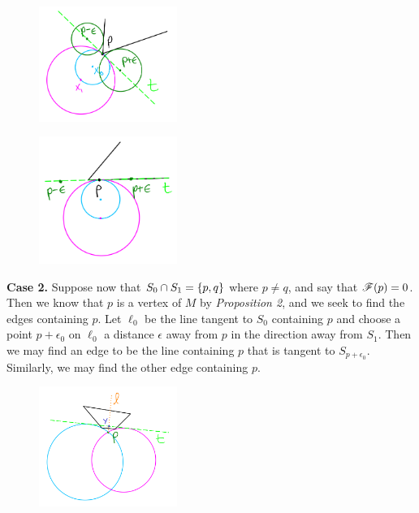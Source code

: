 \documentclass[12pt]{article}
\begin{document}
\begin{flushleft}
\begin{figure}[H]
	\centering
	\includegraphics[width=0.4\textwidth]{5.png}
\end{figure}
\begin{figure}[H]
	\centering
	\includegraphics[width=0.4\textwidth]{6.png}
\end{figure}

\textbf{Case 2.}
Suppose now that $S_0\cap S_1=\{p,q\}$ where $p\neq q$, and say that $\mathscr{F}(p)=0$.
Then we know that $p$ is a vertex of $M$ by \textit{Proposition 2}, and we seek to find the edges containing $p$.
Let $\ell_0$ be the line tangent to $S_0$ containing $p$ and choose a point $p+\epsilon_0$ on $\ell_0$ a distance $\epsilon$ away from $p$ in the direction away from $S_1$.
Then we may find an edge to be the line containing $p$ that is tangent to $S_{p+\epsilon_0}$.
Similarly, we may find the other edge containing $p$.

\begin{figure}[H]
	\centering
	\includegraphics[width=0.4\textwidth]{7.png}
\end{figure}


\end{flushleft}
\end{document}

